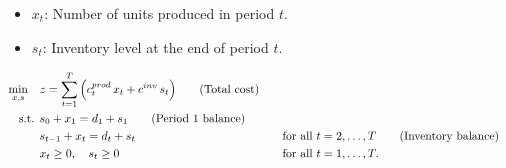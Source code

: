 \begin{itemize}
    \item \(x_t\): Number of units produced in period \(t\).
    \item \(s_t\): Inventory level at the end of period \(t\).
\end{itemize}

\begin{align*}
\min_{x,s} \quad & z = \sum_{t=1}^{T} \Big( c^{prod}_t\, x_t + c^{inv}\, s_t \Big)   \tag{Total cost} \\
\mbox{ s.t. }        & s_0 + x_1 = d_1 + s_1   \tag{Period 1 balance} \\
                 & s_{t-1} + x_t = d_t + s_t &&\quad \mbox{for all } t=2,\dots,T   \tag{Inventory balance} \\
                 & x_t \geq 0,\quad s_t \geq 0 &&\quad \mbox{for all } t=1,\dots,T.
\end{align*}

